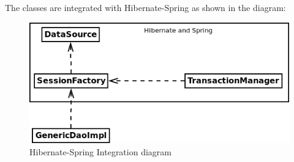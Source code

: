 \documentclass[a4paper,11pt]{book}
\begin{document}
The classes are integrated with Hibernate-Spring as shown in the diagram:

\begin{figure}[h] %
  \includegraphics[width=\textwidth]{generic_persistence_integration_diagram}
  \caption{Hibernate-Spring Integration diagram}
  \centering
  \label{fig:generic_persistence_integration_diagram} %
\end{figure}
\end{document}
